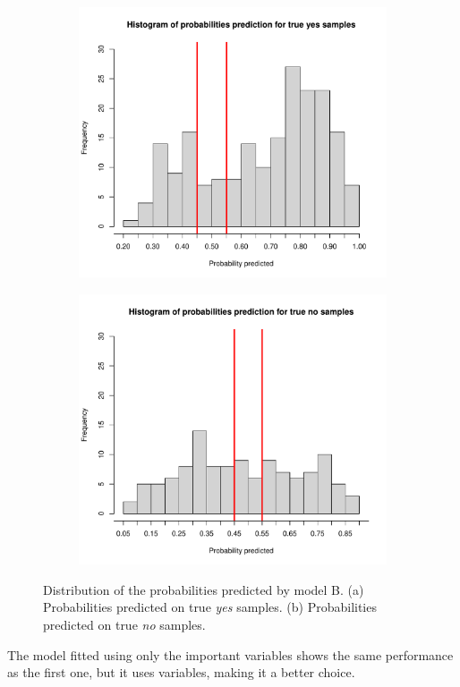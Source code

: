 \begin{figure}[h]
	\begin{subfigure}{.5\textwidth}
		\centering
		\includegraphics[width=0.7\linewidth]{ImageFiles/Classification/LogReg/probability_pred_imp_yes}
		\caption{}
		\label{fig:ProbPredYesB}
	\end{subfigure}
	\begin{subfigure}{.5\textwidth}
		\centering
		\includegraphics[width=0.7\linewidth]{ImageFiles/Classification/LogReg/probability_pred_imp_no}
		\caption{}
		\label{fig:ProbPredNoB}
	\end{subfigure}
	\caption{Distribution of the probabilities predicted by model B. (a) Probabilities predicted on true \textit{yes} samples. (b) Probabilities predicted on true \textit{no} samples.}
	\label{fig:ProbPredB}
\end{figure}

The model fitted using only the important variables shows the same performance as the first one, but it uses variables, making it a better choice.

